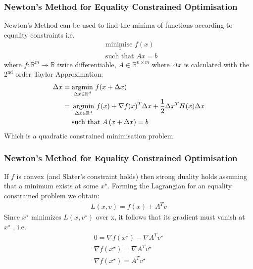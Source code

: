 \documentclass{beamer}
\def\rnum{\mathbb{R}}
\begin{document}
\begin{frame}
    \frametitle{Newton's Method for Equality Constrained Optimisation}
    Newton's Method can be used to find the minima of functions according to
    equality constraints i.e.
    \begin{align*}
        &\underset{x}{\text{minimise }}  f(x) \\
        &\text{such that } A x = b
    \end{align*}
    where $f : \rnum^{m} \rightarrow \rnum$ twice differentiable, $A \in \rnum^{n \times m} $
    where $\Delta x$ is calculated with the $2^{\text{nd}}$ order Taylor Approximation:
    {\footnotesize
    \begin{align*}
        \Delta x &= \underset{\Delta x \in \rnum^{d}}{\text{argmin}}\, \,f(x + \Delta
        x)  \\
        &= \, \underset{\Delta x \in \rnum^{d}}{\text{argmin}} \, \, f(x) + \nabla f(x)^{T}
        \Delta x + \frac{1}{2}\Delta x^{T}H(x)\Delta x \\ \vspace{1mm}
        &\,\,\,\,\,\, \text{             such that } A\, (x + \Delta x) = b
    \end{align*}}
    Which is a quadratic constrained minimisation problem.
\end{frame}

\begin{frame}
    \frametitle{Newton's Method for Equality Constrained Optimisation}
    If $f$ is convex (and Slater's constraint holds) then strong duality holds
    assuming that a minimum exists at some $x^{\star}$.
    Forming the Lagrangian for an equality constrained problem we
    obtain:
    \begin{align*}
        L(x, v) = f(x) + A^{T}v
    \end{align*}
    Since $x^{\star}$ minimizes $L(x, v^{\star} )$ over x, it follows that
    its gradient must vanish at $x^{\star}$ , i.e.
    \begin{align*}
        0 = \nabla f(x^{\star}) -  \nabla A^{T}v^{\star} \\
        \nabla f(x^{\star}) = \nabla A^{T}v^{\star} \\
        \nabla f(x^{\star}) = A^{T} v^{\star}
    \end{align*}
\end{frame}
\end{document}
